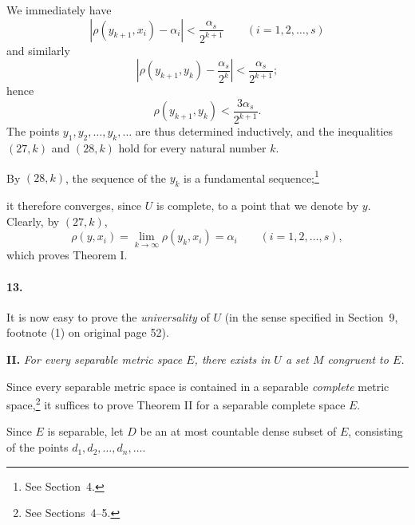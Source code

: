 \documentclass[a4paper,12pt]{amsart}
\newcommand{\srcpage}[1]{} %
\begin{document}
We immediately have
\begin{equation}\tag{27, $k+1$}
|\rho(y_{k+1},x_i)-\alpha_i|<\frac{\alpha_s}{2^{k+1}}\qquad(i=1,2,\dots,s)
\end{equation}
and similarly
\[
\left|\rho(y_{k+1},y_k)-\frac{\alpha_s}{2^k}\right|<\frac{\alpha_s}{2^{k+1}};
\]
hence
\begin{equation}\tag{28, $k+1$}
\rho(y_{k+1},y_k)<\frac{3\alpha_s}{2^{k+1}}.
\end{equation}
The points $y_1,y_2,\dots,y_k,\dots$ are thus determined inductively, and the inequalities $(27,k)$ and $(28,k)$ hold for every natural number $k$.

By $(28,k)$, the sequence of the $y_k$ is a fundamental sequence;\footnote{See Section~4.}
\srcpage{63}
it therefore converges, since $U$ is complete, to a point that we denote by $y$. Clearly, by $(27,k)$,
\[
\rho(y,x_i)=\lim_{k\to\infty}\rho(y_k,x_i)=\alpha_i\qquad(i=1,2,\dots,s),
\]
which proves Theorem I.

\paragraph{13.}
It is now easy to prove the \textit{universality} of $U$ (in the sense specified in Section~9, footnote (1) on original page 52).

\textbf{II.} \textit{For every separable metric space $E$, there exists in $U$ a set $M$ congruent to $E$.}

Since every separable metric space is contained in a separable \textit{complete} metric space,\footnote{See Sections~4--5.} it suffices to prove Theorem II for a separable complete space $E$.

Since $E$ is separable, let $D$ be an at most countable dense subset of $E$, consisting of the points $d_1,d_2,\dots,d_n,\dots$.
\end{document}

